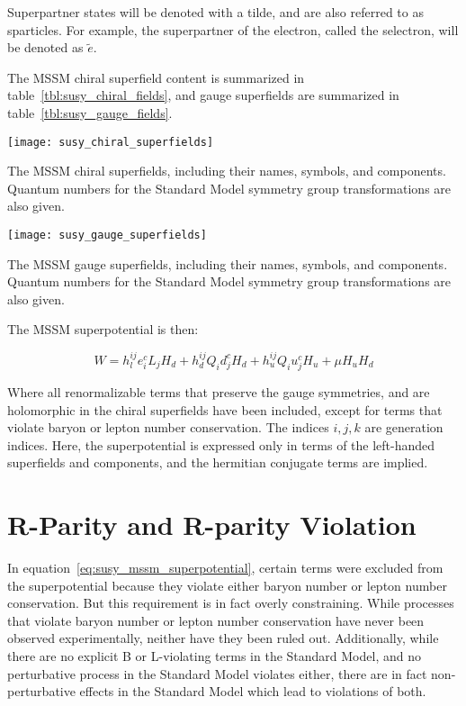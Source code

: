 Superpartner states will be denoted with a tilde, and are also referred to as sparticles.
For example, the superpartner of the electron, called the selectron, will be denoted as $\tilde{e}$.

The MSSM chiral superfield content is summarized in table~\ref{tbl:susy_chiral_fields},
and gauge superfields are summarized in table~\ref{tbl:susy_gauge_fields}.

\begin{table}[h!]\label{tbl:susy_chiral_fields}
    \centering


  \texttt{[image: susy\_chiral\_superfields]}
    \caption{The MSSM chiral superfields, including their names, symbols, and components.
  Quantum numbers for the Standard Model symmetry group transformations are also given.}\cite{susy-primer-1998}
\end{table}

\begin{table}[h!]\label{tbl:susy_gauge_fields}
    \centering

  \texttt{[image: susy\_gauge\_superfields]}
    \caption{The MSSM gauge superfields, including their names, symbols, and components.
  Quantum numbers for the Standard Model symmetry group transformations are also given.}\cite{susy-primer-1998}
\end{table}

The MSSM superpotential is then:

\begin{equation}\label{eq:susy_mssm_superpotential}
    W = h_l^{ij} e_i^c L_j H_d + h_d^{ij} Q_i d_j^c H_d + h_u^{ij} Q_i u_j^c H_u + \mu H_u H_d
\end{equation}

Where all renormalizable terms that preserve the gauge symmetries, and are holomorphic in the chiral superfields have been included,
except for terms that violate baryon or lepton number conservation.
The indices $i, j, k$ are generation indices.
Here, the superpotential is expressed only in terms of the left-handed superfields and components,
and the hermitian conjugate terms are implied.

\section{R-Parity and R-parity Violation}\label{sec:susy_rpv}

In equation~\ref{eq:susy_mssm_superpotential}, certain terms were excluded from the superpotential because they
violate either baryon number or lepton number conservation.
But this requirement is in fact overly constraining.
While processes that violate baryon number or lepton number conservation have never been observed experimentally,
neither have they been ruled out.
Additionally, while there are no explicit B or L-violating terms in the Standard Model,
and no perturbative process in the Standard Model violates either,
there are in fact non-perturbative effects in the Standard Model which lead to violations of both.\cite{susy-bl-violation}


